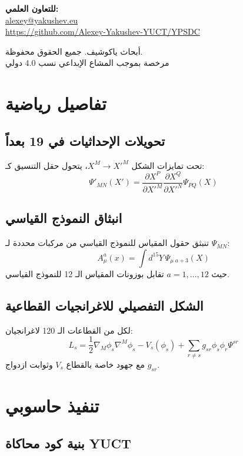 \documentclass[11pt,a4paper]{article}
\theoremstyle{remark}
\begin{document}
	\begin{center}
		\vspace{1cm}
		\textbf{للتعاون العلمي:}\\
		\url{alexey@yakushev.eu}\\
		\url{https://github.com/Alexey-Yakushev-YUCT/YPSDC}
		
		\vspace{0.5cm}
		 أبحاث ياكوشيف. جميع الحقوق محفوظة.\\
		مرخصة بموجب المشاع الإبداعي نسب 4.0 دولي
	\end{center}
	
	\appendix
	\section{تفاصيل رياضية}
	\label{app:math-details}
	
	\subsection{تحويلات الإحداثيات في 19 بعداً}
	
	تحت تمايزات الشكل $X^M \to X'^M$، يتحول حقل التنسيق كـ:
	\[
	\Psi'_{MN}(X') = \frac{\partial X^P}{\partial X'^M} \frac{\partial X^Q}{\partial X'^N} \Psi_{PQ}(X)
	\]
	
	\subsection{انبثاق النموذج القياسي}
	
	تنبثق حقول المقياس للنموذج القياسي من مركبات محددة لـ $\Psi_{MN}$:
	\[
	A_\mu^a(x) = \int d^{15}Y \, \Psi_{\mu\;a+3}(X)
	\]
	حيث $a=1,\dots,12$ تقابل بوزونات المقياس الـ 12 للنموذج القياسي.
	
	\subsection{الشكل التفصيلي للاغرانجيات القطاعية}
	
	لكل من القطاعات الـ 120 لاغرانجيان:
	\[
	L_s = \frac{1}{2} \nabla_M \phi_s \nabla^M \phi_s - V_s(\phi_s) + \sum_{r \neq s} g_{sr} \phi_s \phi_r \Psi^{sr}
	\]
	مع جهود خاصة بالقطاع $V_s$ وثوابت ازدواج $g_{sr}$.
	
	\section{تنفيذ حاسوبي}
	\label{app:computational}
	
	\subsection{بنية كود محاكاة YUCT}
	
\end{document}

